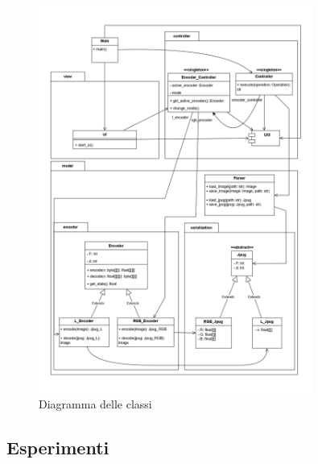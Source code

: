     \begin{figure}[ht]
        \centering
        \includegraphics[width=0.8\textwidth]{images/class_diagram.jpg}
        \caption{Diagramma delle classi}
        \label{fig:class_diagram}
    \end{figure}

\subsection{Esperimenti} \label{experiments}